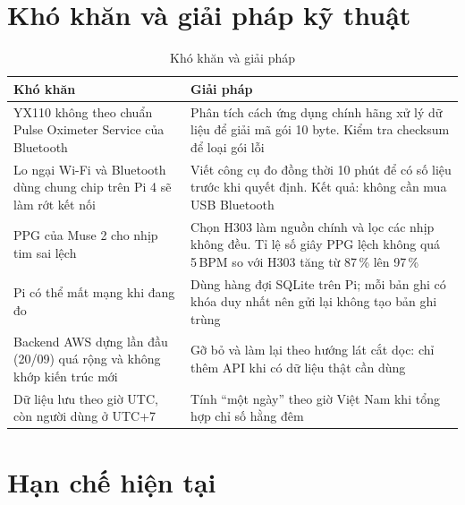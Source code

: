 \documentclass[12pt,a4paper]{article}
\begin{document}

\section{Khó khăn và giải pháp kỹ thuật}

\begin{table}[h]
  \centering
  \caption{Khó khăn và giải pháp}
  \begin{tabularx}{\textwidth}{@{}p{5.6cm}L@{}}
    \toprule
    Khó khăn & Giải pháp \\
    \midrule
    YX110 không theo chuẩn Pulse Oximeter Service của Bluetooth & Phân tích cách ứng dụng chính hãng xử lý dữ liệu để giải mã gói 10 byte. Kiểm tra checksum để loại gói lỗi \\
    Lo ngại Wi-Fi và Bluetooth dùng chung chip trên Pi 4 sẽ làm rớt kết nối & Viết công cụ đo đồng thời 10 phút để có số liệu trước khi quyết định. Kết quả: không cần mua USB Bluetooth \\
    PPG của Muse 2 cho nhịp tim sai lệch & Chọn H303 làm nguồn chính và lọc các nhịp không đều. Tỉ lệ số giây PPG lệch không quá 5\,BPM so với H303 tăng từ 87\,\% lên 97\,\% \\
    Pi có thể mất mạng khi đang đo & Dùng hàng đợi SQLite trên Pi; mỗi bản ghi có khóa duy nhất nên gửi lại không tạo bản ghi trùng \\
    Backend AWS dựng lần đầu (20/09) quá rộng và không khớp kiến trúc mới & Gỡ bỏ và làm lại theo hướng lát cắt dọc: chỉ thêm API khi có dữ liệu thật cần dùng \\
    Dữ liệu lưu theo giờ UTC, còn người dùng ở UTC+7 & Tính ``một ngày'' theo giờ Việt Nam khi tổng hợp chỉ số hằng đêm \\
    \bottomrule
  \end{tabularx}
\end{table}

\section{Hạn chế hiện tại}
\end{document}
